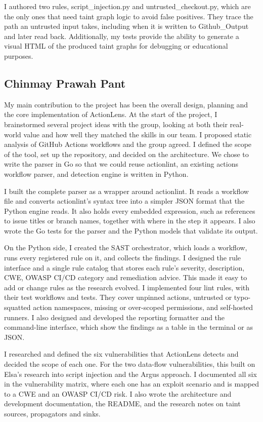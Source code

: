 \documentclass{article}
\begin{document}
I authored two rules, script\_injection.py and untrusted\_checkout.py, which are the only ones that need taint graph logic to avoid false positives. They trace the path an untrusted input takes, including when it is written to Github\_Output and later read back. Additionally, my tests provide the ability to generate a visual HTML of the produced taint graphs for debugging or educational purposes. 

\subsection{Chinmay Prawah Pant}
My main contribution to the project has been the overall design, planning and the core implementation of ActionLens. At the start of the project, I brainstormed several project ideas with the group, looking at both their real-world value and how well they matched the skills in our team. I proposed static analysis of GitHub Actions workflows and the group agreed. I defined the scope of the tool, set up the repository, and decided on the architecture. We chose to write the parser in Go so that we could reuse actionlint, an existing actions workflow parser, and detection engine is written in Python.

I built the complete parser as a wrapper around actionlint. It reads a workflow file and converts actionlint’s syntax tree into a simpler JSON format that the Python engine reads. It also holds every embedded expression, such as references to issue titles or branch names, together with where in the step it appears. I also wrote the Go tests for the parser and the Python models that validate its output.

On the Python side, I created the SAST orchestrator, which loads a workflow, runs every registered rule on it, and collects the findings. I designed the rule interface and a single rule catalog that stores each rule’s severity, description, CWE, OWASP CI/CD category and remediation advice. This made it easy to add or change rules as the research evolved. I implemented four lint rules, with their test workflows and tests. They cover unpinned actions, untrusted or typo-squatted action namespaces, missing or over-scoped permissions, and self-hosted runners. I also designed and developed the reporting formatter and the command-line interface, which show the findings as a table in the terminal or as JSON.

I researched and defined the six vulnerabilities that ActionLens detects and decided the scope of each one. For the two data-flow vulnerabilities, this built on Elsa’s research into script injection and the Argus approach. I documented all six in the vulnerability matrix, where each one has an exploit scenario and is mapped to a CWE and an OWASP CI/CD risk. I also wrote the architecture and development documentation, the README, and the research notes on taint sources, propagators and sinks.
\end{document}
